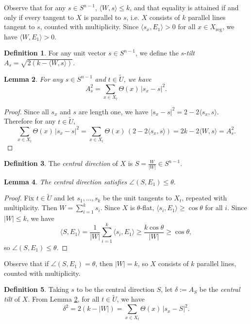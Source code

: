 \documentclass[11pt,reqno,twoside]{amsart}
\newcommand{\reg}{\mathrm{reg}}
\newtheorem{lemma}{Lemma}
\theoremstyle{definition}
\newtheorem{definition}[lemma]{Definition}
\begin{document}
Observe that for any $s \in S^{n-1}$, $\langle W,s\rangle \leq k$, and that equality is attained if and only if every tangent to $X$ is parallel to $s$, i.e. $X$ consists of $k$ parallel lines tangent to $s$, counted with multiplicity. Since $\langle s_x,E_1\rangle > 0$ for all $x \in X_\reg$, we have $\langle W,E_1\rangle > 0.$

\begin{definition}
    For any unit vector $s \in S^{n-1}$, we define the $s$-\emph{tilt} $A_s = \sqrt{2(k-\langle W,s\rangle)}.$
\end{definition}

\begin{lemma} \label{tilt-formula}
    For any $s \in S^{n-1}$ and $t \in \tilde U$, we have
    \[A_s^2 = \sum_{x \in X_t} \Theta(x) \, |s_x-s|^2.\]
\end{lemma}
\begin{proof}
    Since all $s_x$ and $s$ are length one, we have $|s_x-s|^2 = 2-2\langle s_x,s\rangle.$ Therefore for any $t \in \tilde U$,
    \[\sum_{x \in X_t} \Theta(x) \, |s_x-s|^2 = \sum_{x \in X_t} \Theta(x) \, (2 - 2\langle s_x,s\rangle) = 2k - 2 \langle W,s\rangle = A_s^2.\]
\end{proof}

\begin{definition}
    The \emph{central direction} of $X$ is $S = \frac{W}{|W|} \in S^{n-1}.$ 
\end{definition}

\begin{lemma}
    The central direction satisfies $\angle(S,E_1) \leq \theta.$
\end{lemma}
\begin{proof}
    Fix $t \in \tilde U$ and let $s_1,\ldots,s_k$ be the unit tangents to $X_t$, repeated with multiplicity. Then $W = \sum_{i=1}^k s_i$. Since $X$ is $\theta$-flat, $\langle s_i,E_1\rangle \geq \cos \theta$ for all $i$. Since $|W| \leq k$, we have 
    \[\langle S,E_1\rangle = \frac{1}{|W|} \sum_{i=1}^k \langle s_i,E_1\rangle \geq \frac{k \cos \theta}{|W|} \geq \cos \theta,\]
    so $\angle(S,E_1) \leq \theta.$
\end{proof}

Observe that if $\angle(S,E_1) = \theta$, then $|W| = k$, so $X$ consists of $k$ parallel lines, counted with multiplicity.

\begin{definition}
    Taking $s$ to be the central direction $S$, let $\delta := A_S$ be the \emph{central tilt} of $X$. From Lemma \ref{tilt-formula}, for all $t \in \tilde U$, we have
    \[\delta^2 = 2(k-|W|) = \sum_{x \in X_t} \Theta(x) \, |s_x-S|^2.\]
\end{definition}
\end{document}
